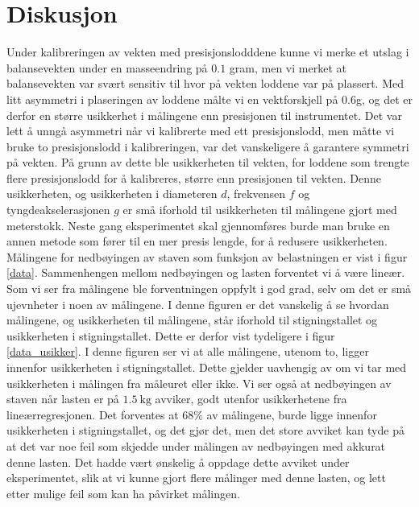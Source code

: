 \documentclass[%
 reprint,
nofootinbib,
aps,
]{revtex4-1}
\begin{document}
\section{Diskusjon}
Under kalibreringen av vekten med presisjonslodddene kunne vi merke et utslag i balansevekten under en masseendring på $0.1$ gram, men vi merket at balansevekten var svært sensitiv til hvor på vekten loddene var på plassert. Med litt asymmetri i plaseringen av loddene målte vi en vektforskjell på $0.6$g, og det er derfor en større usikkerhet i målingene enn presisjonen til instrumentet. Det var lett å unngå asymmetri når vi kalibrerte med ett presisjonslodd, men måtte vi bruke to presisjonslodd i kalibreringen, var det vanskeligere å garantere symmetri på vekten. På grunn av dette ble usikkerheten til vekten, for loddene som trengte flere presisjonslodd for å kalibreres, større enn presisjonen til vekten. Denne usikkerheten, og usikkerheten i diameteren $d$, frekvensen $f$ og tyngdeakselerasjonen $g$ er små iforhold til usikkerheten til målingene gjort med meterstokk. Neste gang eksperimentet skal gjennomføres burde man bruke en annen metode som fører til en mer presis lengde, for å redusere usikkerheten.\\
Målingene for nedbøyingen av staven som funksjon av belastningen er vist i figur \vref{data}. Sammenhengen mellom nedbøyingen og lasten forventet vi å være lineær. Som vi ser fra målingene ble forventningen oppfylt i god grad, selv om det er små ujevnheter i noen av målingene. I denne figuren er det vanskelig å se hvordan målingene, og usikkerheten til målingene, står iforhold til stigningstallet og usikkerheten i stigningstallet. Dette er derfor vist tydeligere i figur \vref{data_usikker}. I denne figuren ser vi at alle målingene, utenom to, ligger innenfor usikkerheten i stigningstallet. Dette gjelder uavhengig av om vi tar med usikkerheten i målingen fra måleuret eller ikke. Vi ser også at nedbøyingen av staven når lasten er på $\SI{1.5}{\kilo\gram}$ avviker, godt utenfor usikkerhetene fra lineærregresjonen. Det forventes at $68\%$ av målingene, burde ligge innenfor usikkerheten i stigningstallet, og det gjør det, men det store avviket kan tyde på at det var noe feil som skjedde under målingen av nedbøyingen med akkurat denne lasten. Det hadde vært ønskelig å oppdage dette avviket under eksperimentet, slik at vi kunne gjort flere målinger med denne lasten, og lett etter mulige feil som kan ha påvirket målingen.\\
\end{document}
